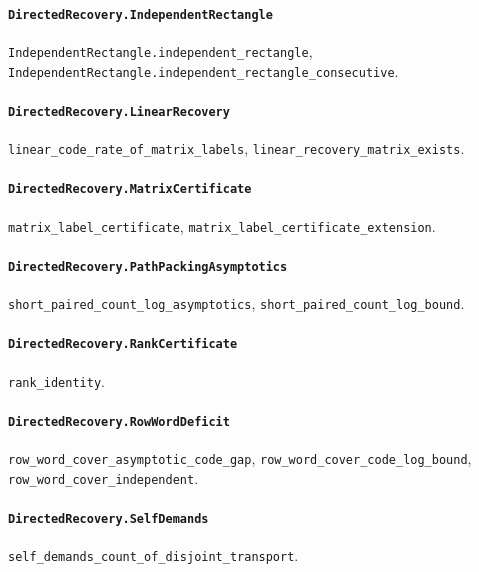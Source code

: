 \paragraph{\texttt{DirectedRecovery.IndependentRectangle}}
{\small\raggedright \texttt{IndependentRectangle.independent\_rectangle}, \texttt{IndependentRectangle.independent\_rectangle\_consecutive}.\par}

\paragraph{\texttt{DirectedRecovery.LinearRecovery}}
{\small\raggedright \texttt{linear\_code\_rate\_of\_matrix\_labels}, \texttt{linear\_recovery\_matrix\_exists}.\par}

\paragraph{\texttt{DirectedRecovery.MatrixCertificate}}
{\small\raggedright \texttt{matrix\_label\_certificate}, \texttt{matrix\_label\_certificate\_extension}.\par}

\paragraph{\texttt{DirectedRecovery.PathPackingAsymptotics}}
{\small\raggedright \texttt{short\_paired\_count\_log\_asymptotics}, \texttt{short\_paired\_count\_log\_bound}.\par}

\paragraph{\texttt{DirectedRecovery.RankCertificate}}
{\small\raggedright \texttt{rank\_identity}.\par}

\paragraph{\texttt{DirectedRecovery.RowWordDeficit}}
{\small\raggedright \texttt{row\_word\_cover\_asymptotic\_code\_gap}, \texttt{row\_word\_cover\_code\_log\_bound}, \texttt{row\_word\_cover\_independent}.\par}

\paragraph{\texttt{DirectedRecovery.SelfDemands}}
{\small\raggedright \texttt{self\_demands\_count\_of\_disjoint\_transport}.\par}

